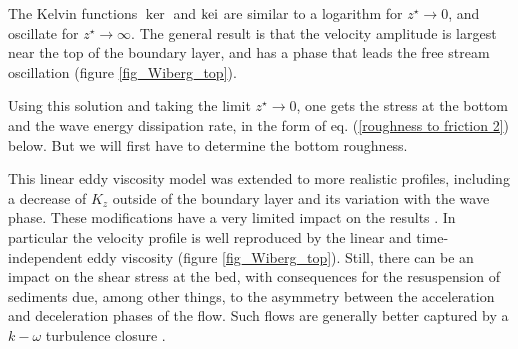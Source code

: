 The Kelvin functions $\ker$ and ${\rm kei}$ are similar to a 
logarithm for $z^\star\rightarrow 0$, and oscillate for  $z^\star \rightarrow  \infty$. The general result is that the 
velocity amplitude is largest near the top of the boundary layer, and has a phase that leads the free stream oscillation  (figure \ref{fig_Wiberg_top}). 

Using this solution and taking the limit  $z^\star\rightarrow 0$, one gets the stress at the bottom and the wave energy dissipation rate, in the form of eq.  (\ref{roughness to friction 2}) below.
But we will first have to determine the bottom roughness.

This linear eddy viscosity model was extended to more realistic profiles, including a decrease of $K_z$ outside of the boundary layer and its variation with the wave phase. These modifications
have a very limited impact on the results \citep{Trowbridge&Madsen1984a,Jensen&al.1989,Wiberg1995,Davies&Villaret1999,Marin2004}. In particular the velocity profile is well reproduced by the 
linear and time-independent eddy viscosity (figure \ref{fig_Wiberg_top}). Still, there can be an impact on the shear stress at the bed, with consequences for the resuspension of sediments due, among other things, 
to the asymmetry between the acceleration and deceleration phases of the flow. Such flows are generally better captured by a $k-\omega$ turbulence closure \citep[e.g.][]{Marieu&al.2008}.
